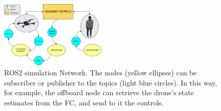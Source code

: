 \begin{figure}
    \centering
    \includegraphics[width=0.45\textwidth]{images/nodi_simulazione.png}
    \caption{ROS2 simulation Network. The nodes (yellow ellipses) can be subscriber or publisher to the topics (light blue circles). In this way, for example, the offboard node can retrieve the drone's state estimates from the FC, and send to it the controls.}
    \label{SIM:fig:nodism}
\end{figure}

